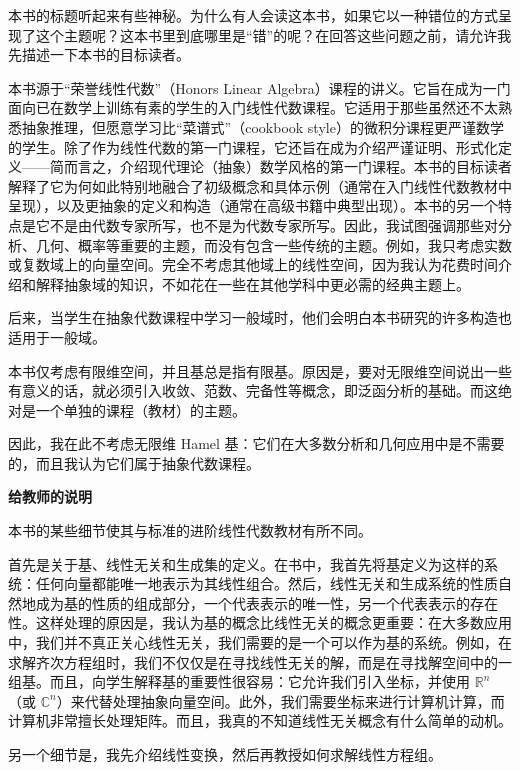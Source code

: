 \begin{preface}
本书的标题听起来有些神秘。为什么有人会读这本书，如果它以一种错位的方式呈现了这个主题呢？这本书里到底哪里是“错”的呢？在回答这些问题之前，请允许我先描述一下本书的目标读者。

本书源于“荣誉线性代数”（Honors Linear Algebra）课程的讲义。它旨在成为一门面向已在数学上训练有素的学生的入门线性代数课程。它适用于那些虽然还不太熟悉抽象推理，但愿意学习比“菜谱式”（cookbook style）的微积分课程更严谨数学的学生。除了作为线性代数的第一门课程，它还旨在成为介绍严谨证明、形式化定义——简而言之，介绍现代理论（抽象）数学风格的第一门课程。本书的目标读者解释了它为何如此特别地融合了初级概念和具体示例（通常在入门线性代数教材中呈现），以及更抽象的定义和构造（通常在高级书籍中典型出现）。本书的另一个特点是它不是由代数专家所写，也不是为代数专家所写。因此，我试图强调那些对分析、几何、概率等重要的主题，而没有包含一些传统的主题。例如，我只考虑实数或复数域上的向量空间。完全不考虑其他域上的线性空间，因为我认为花费时间介绍和解释抽象域的知识，不如花在一些在其他学科中更必需的经典主题上。

后来，当学生在抽象代数课程中学习一般域时，他们会明白本书研究的许多构造也适用于一般域。

本书仅考虑有限维空间，并且基总是指有限基。原因是，要对无限维空间说出一些有意义的话，就必须引入收敛、范数、完备性等概念，即泛函分析的基础。而这绝对是一个单独的课程（教材）的主题。

因此，我在此不考虑无限维 Hamel 基：它们在大多数分析和几何应用中是不需要的，而且我认为它们属于抽象代数课程。

\vspace{2ex}
\textbf{给教师的说明}

本书的某些细节使其与标准的进阶线性代数教材有所不同。

首先是关于基、线性无关和生成集的定义。在书中，我首先将基定义为这样的系统：任何向量都能唯一地表示为其线性组合。然后，线性无关和生成系统的性质自然地成为基的性质的组成部分，一个代表表示的唯一性，另一个代表表示的存在性。这样处理的原因是，我认为基的概念比线性无关的概念更重要：在大多数应用中，我们并不真正关心线性无关，我们需要的是一个可以作为基的系统。例如，在求解齐次方程组时，我们不仅仅是在寻找线性无关的解，而是在寻找解空间中的一组基。而且，向学生解释基的重要性很容易：它允许我们引入坐标，并使用 $\mathbb{R}^n$（或 $\mathbb{C}^n$）来代替处理抽象向量空间。此外，我们需要坐标来进行计算机计算，而计算机非常擅长处理矩阵。而且，我真的不知道线性无关概念有什么简单的动机。

另一个细节是，我先介绍线性变换，然后再教授如何求解线性方程组。


\end{preface}
